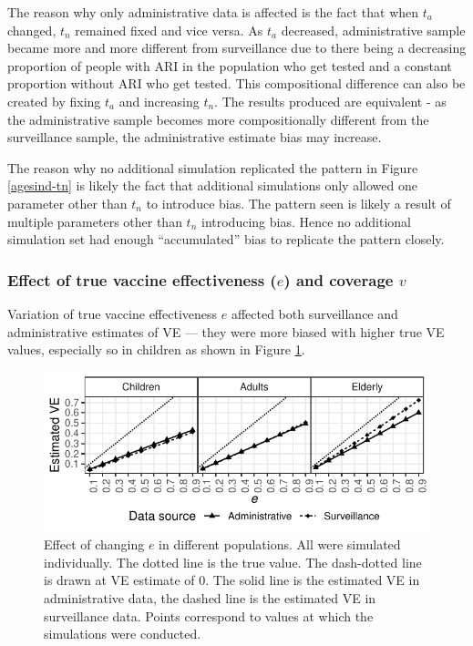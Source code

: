 \documentclass[11pt]{article}
\begin{document}
\pagebreak

The reason why only administrative data is affected is the fact that when $t_a$ changed, $t_n$ remained fixed and vice versa. As $t_a$ decreased, administrative sample became more and more different from surveillance due to there being a decreasing proportion of people with ARI in the population who get tested and a constant proportion without ARI who get tested. This compositional difference can also be created by fixing $t_a$ and increasing $t_n$. The results produced are equivalent - as the administrative sample becomes more compositionally different from the surveillance sample, the administrative estimate bias may increase. 

The reason why no additional simulation replicated the pattern in Figure \ref{agesind-tn} is likely the fact that additional simulations only allowed one parameter other than $t_n$ to introduce bias. The pattern seen is likely a result of multiple parameters other than $t_n$ introducing bias. Hence no additional simulation set had enough ``accumulated'' bias to replicate the pattern closely.

\subsubsection{Effect of true vaccine effectiveness ($e$) and coverage $v$}

Variation of true vaccine effectiveness $e$ affected both surveillance and administrative estimates of VE --- they were more biased with higher true VE values, especially so in children as shown in Figure \ref{agesind-ve}.

\begin{figure}[h]
	\centering
		\includegraphics[width=0.75\linewidth]{../fig-agesind/agesind-ve.pdf}
		\caption{
Effect of changing $e$ in different populations. All were simulated individually. The dotted line is the true value. The dash-dotted line is drawn at VE estimate of 0. The solid line is the estimated VE in administrative data, the dashed line is the estimated VE in surveillance data. Points correspond to values at which the simulations were conducted.  \label{agesind-ve}
		}
\end{figure}
\end{document}
